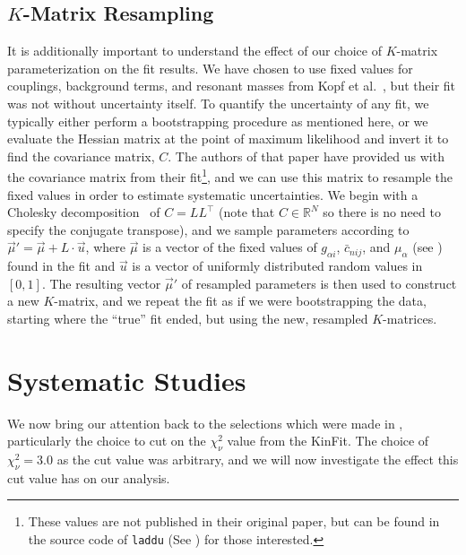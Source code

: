 \subsection{$K$-Matrix Resampling}\label{sub:k-matrix-resampling}

It is additionally important to understand the effect of our choice of $K$-matrix parameterization on the fit results. We have chosen to use fixed values for couplings, background terms, and resonant masses from Kopf et al.~\cite{Kopf2021}, but their fit was not without uncertainty itself. To quantify the uncertainty of any fit, we typically either perform a bootstrapping procedure as mentioned here, or we evaluate the Hessian matrix at the point of maximum likelihood and invert it to find the covariance matrix, $C$. The authors of that paper have provided us with the covariance matrix from their fit\footnote{These values are not published in their original paper, but can be found in the source code of \texttt{laddu} (See ) for those interested.}, and we can use this matrix to resample the fixed values in order to estimate systematic uncertainties. We begin with a Cholesky decomposition~\cite{Cholesky1924} of $C = LL^\intercal$ (note that $C \in \mathbb{R}^N$ so there is no need to specify the conjugate transpose), and we sample parameters according to $\vec{\mu}' = \vec{\mu} + L\cdot \vec{u}$, where $\vec{\mu}$ is a vector of the fixed values of $g_{\alpha i}$, $\bar{c}_{nij}$, and $\mu_\alpha$ (see ) found in the fit and $\vec{u}$ is a vector of uniformly distributed random values in $[0, 1]$. The resulting vector $\vec{\mu}'$ of resampled parameters is then used to construct a new $K$-matrix, and we repeat the fit as if we were bootstrapping the data, starting where the ``true'' fit ended, but using the new, resampled $K$-matrices.


\section{Systematic Studies}\label{sec:systematic-studies}

We now bring our attention back to the selections which were made in , particularly the choice to cut on the $\chi^2_\nu$ value from the KinFit. The choice of $\chi^2_\nu = 3.0$ as the cut value was arbitrary, and we will now investigate the effect this cut value has on our analysis.

